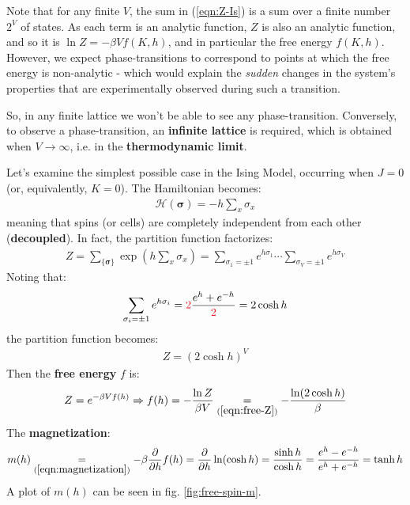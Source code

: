 \documentclass[../template.tex]{subfiles}
\begin{document}
Note that for any finite $V$, the sum in (\ref{eqn:Z-Is}) is a sum over a finite number $2^V$ of states. As each term is an analytic function, $Z$ is also an analytic function, and so it is $\ln Z = - \beta V f(K,h)$, and in particular the free energy $f(K,h)$. However, we expect phase-transitions to correspond to points at which the free energy is non-analytic - which would explain the \textit{sudden} changes in the system's properties that are experimentally observed during such a transition. %

So, in any finite lattice we won't be able to see any phase-transition. Conversely, to observe a phase-transition, an \textbf{infinite lattice} is required, which is obtained when $V \to \infty$, i.e. in the \textbf{thermodynamic limit}. 

\begin{example}
    Let's examine the simplest possible case in the Ising Model, occurring when $J=0$ (or, equivalently, $K=0$). The Hamiltonian becomes:
    \begin{align}\label{eqn:free-H}
        \mathcal{H}(\bm{\sigma}) = -h \sum_x \sigma_x
    \end{align}
    meaning that spins (or cells) are completely independent from each other (\textbf{decoupled}). In fact, the partition function factorizes:
    \begin{align*}
        Z= \sum_{\{\bm{\sigma}\}} \exp({h \sum_x \sigma_x}) = \sum_{\sigma_1 = \pm 1} e^{h \sigma_1} \cdots \sum_{\sigma_V = \pm 1}e^{h \sigma_V}
    \end{align*}
    Noting that:
    \begin{align*}
        \sum_{\sigma_i = \pm 1} e^{h \sigma_i} = \textcolor{Red}{2} \frac{e^{h} + e^{-h}}{\textcolor{Red}{2}} = 2 \cosh h
    \end{align*}
    the partition function becomes:
    \begin{align} \label{eqn:free-Z}
        Z = (2 \cosh h)^V
    \end{align}
    Then the \textbf{free energy} $f$ is:
    \begin{align}\label{eqn:free-f}
        Z = e^{- \beta V f(h)} \Rightarrow f(h) = - \frac{\ln Z}{\beta V} \underset{(\ref{eqn:free-Z})}{=}  -\frac{\ln(2 \cosh h)}{\beta}
    \end{align}
    The \textbf{magnetization}:
    \begin{align}\label{eqn:mh}
        m(h) \underset{(\ref{eqn:magnetization})}{=}  -\beta \pdv{h}f(h) = \pdv{h} \ln(\cosh h) = \frac{\sinh h}{\cosh h} = \frac{e^h - e^{-h}}{e^{h} + e^{-h}} = \tanh h  
    \end{align}
    A plot of $m(h)$ can be seen in fig. \ref{fig:free-spin-m}. 


\end{example}
\end{document}
